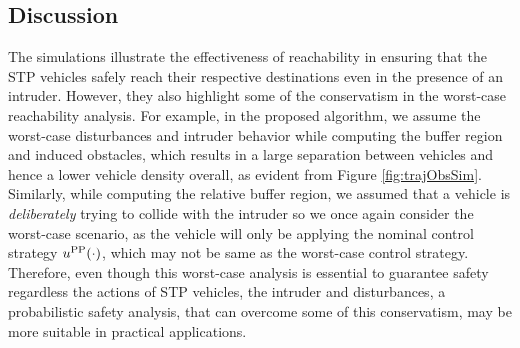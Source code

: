 \subsection{Discussion \label{sec:discuss}}
The simulations illustrate the effectiveness of reachability in ensuring that the STP vehicles safely reach their respective destinations even in the presence of an intruder. However, they also highlight some of the conservatism in the worst-case reachability analysis. For example, in the proposed algorithm, we assume the worst-case disturbances and intruder behavior while computing the buffer region and induced obstacles, which results in a large separation between vehicles and hence a lower vehicle density overall, as evident from Figure \ref{fig:trajObsSim}. Similarly, while computing the relative buffer region, we assumed that a vehicle is \textit{deliberately} trying to collide with the intruder so we once again consider the worst-case scenario, as the vehicle will only be applying the nominal control strategy $u^{\text{PP}}(\cdot)$, which may not be same as the worst-case control strategy. Therefore, even though this worst-case analysis is essential to guarantee safety regardless the actions of STP vehicles, the intruder and disturbances, a probabilistic safety analysis, that can overcome some of this conservatism, may be more suitable in practical applications. 
